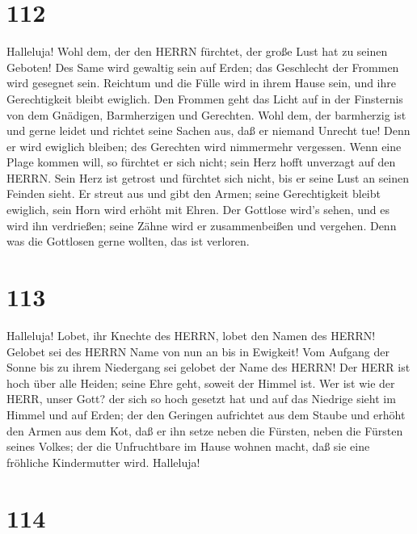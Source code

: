 \hypertarget{section-111}{%
\section{112}\label{section-111}}

 Halleluja! Wohl dem, der den HERRN fürchtet, der große Lust
hat zu seinen Geboten!  Des Same wird gewaltig sein auf
Erden; das Geschlecht der Frommen wird gesegnet sein. 
Reichtum und die Fülle wird in ihrem Hause sein, und ihre Gerechtigkeit
bleibt ewiglich.  Den Frommen geht das Licht auf in der
Finsternis von dem Gnädigen, Barmherzigen und Gerechten. 
Wohl dem, der barmherzig ist und gerne leidet und richtet seine Sachen
aus, daß er niemand Unrecht tue!  Denn er wird ewiglich
bleiben; des Gerechten wird nimmermehr vergessen.  Wenn eine
Plage kommen will, so fürchtet er sich nicht; sein Herz hofft unverzagt
auf den HERRN.  Sein Herz ist getrost und fürchtet sich
nicht, bis er seine Lust an seinen Feinden sieht.  Er streut
aus und gibt den Armen; seine Gerechtigkeit bleibt ewiglich, sein Horn
wird erhöht mit Ehren.  Der Gottlose wird's sehen, und es
wird ihn verdrießen; seine Zähne wird er zusammenbeißen und vergehen.
Denn was die Gottlosen gerne wollten, das ist verloren.

\hypertarget{section-112}{%
\section{113}\label{section-112}}

 Halleluja! Lobet, ihr Knechte des HERRN, lobet den Namen
des HERRN!  Gelobet sei des HERRN Name von nun an bis in
Ewigkeit!  Vom Aufgang der Sonne bis zu ihrem Niedergang sei
gelobet der Name des HERRN!  Der HERR ist hoch über alle
Heiden; seine Ehre geht, soweit der Himmel ist.  Wer ist wie
der HERR, unser Gott? der sich so hoch gesetzt hat  und auf
das Niedrige sieht im Himmel und auf Erden;  der den
Geringen aufrichtet aus dem Staube und erhöht den Armen aus dem Kot,
 daß er ihn setze neben die Fürsten, neben die Fürsten
seines Volkes;  der die Unfruchtbare im Hause wohnen macht,
daß sie eine fröhliche Kindermutter wird. Halleluja!

\hypertarget{section-113}{%
\section{114}\label{section-113}}

